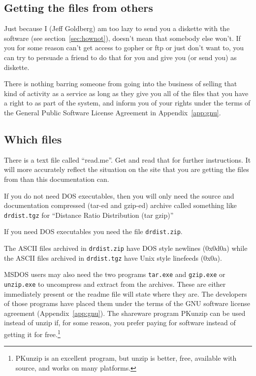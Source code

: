 \documentclass[%
	11pt,
        a4paper,
        twoside]{workrep}
\newcommand*{\prg}[1]{\textsf{#1}}		%
\newcommand*{\file}[1]{\texttt{#1}}		%
\begin{document}
\subsection{Getting the files from others}

Just because I (Jeff Goldberg) am too lazy to send you a diskette
with the software (see section~\ref{sec:hownot}), doesn't mean that
somebody else won't.  If you for some reason can't get access to
gopher or ftp or just don't want to, you can try to persuade a friend
to do that for you and give you (or send you) as diskette.

There is nothing barring someone from going into the business of
selling that kind of activity as a service as long as they give you
all of the files that you have a right to as part of the system, and
inform you of your rights under the terms of the General Public
Software License Agreement in Appendix~\ref{app:gnu}\@.

\subsection{Which files}

There is a text file called ``read.me''.  Get and read that for further
instructions.  It will more accurately reflect the situation on the
site that you are getting the files from than this documentation can.

If you do not need DOS executables, then you will only need the
source and documentation compressed (tar-ed and gzip-ed) archive
called something like \file{drdist.tgz}  for 
``Distance Ratio Distribution (tar gzip)''

If you need DOS executables you need the file \file{drdist.zip}.

The ASCII files archived in \file{drdist.zip} have DOS style newlines
(0x0d0a) while the ASCII files archived in \file{drdist.tgz} have
Unix style linefeeds (0x0a).

MSDOS users may also need the two programs \file{tar.exe} and \file{gzip.exe}
or \file{unzip.exe} to uncompress and extract from the archives.  These
are either immediately present or the readme file will state where they
are.  The developers of those programs have placed them under the
terms of the GNU software license agreement (Appendix~\ref{app:gnu}\@).
The shareware program \prg{PKunzip} can be used instead of \prg{unzip}
if, for some reason, you prefer paying for software instead of getting
it for free.\footnote{\prg{PKunzip} is an excellent program, but \prg{unzip}
is better, free, available with source, and works on many platforms.} 
\end{document}

